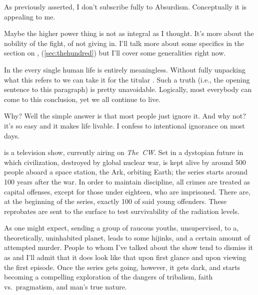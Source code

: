 \documentclass[../butidigress.tex]{subfiles}
\begin{document}
As previously asserted, I don't subscribe fully to Absurdism.
Conceptually it is appealing to me.

Maybe the higher power thing is not as integral as I thought.
It's more about the nobility of the fight, of not giving in.
I'll talk more about some specifics in the section on , (\ref{sec:thehundred}) but I'll cover some generalities right now.


In the  every single human life is entirely meaningless. Without fully unpacking what  this refers to we can take it for the titular . Such a truth (i.e., the opening sentence to this paragraph) is pretty unavoidable. Logically, most everybody can come to this conclusion, yet we all continue to live.\par Why? Well the simple answer is that most people just ignore it. And why not? it's so easy and it makes life livable. I confess to intentional ignorance on most days.

 is a television show, currently airing on \textit{The~CW}.
Set in a dystopian future in which civilization, destroyed by global nuclear war, is kept alive by around 500 people aboard a space station, the Ark, orbiting Earth; the series starts around 100 years after the war.
In order to maintain discipline, all crimes are treated as capital offenses, except for those under eighteen, who are imprisoned.
There are, at the beginning of the series, exactly 100 of said young offenders.
These reprobates are sent to the surface to test survivability of the radiation levels.

As one might expect, sending a group of raucous youths, unsupervised, to a, theoretically, uninhabited planet, leads to some hijinks, and a certain amount of attempted murder.
People to whom I've talked about the show tend to dismiss it as  and I'll admit that it does look like that upon first glance and upon viewing the first episode.
Once the series gets going, however, it gets dark, and starts becoming a compelling exploration of the dangers of tribalism, faith vs.\ pragmatism, and man's true nature.
\end{document}
